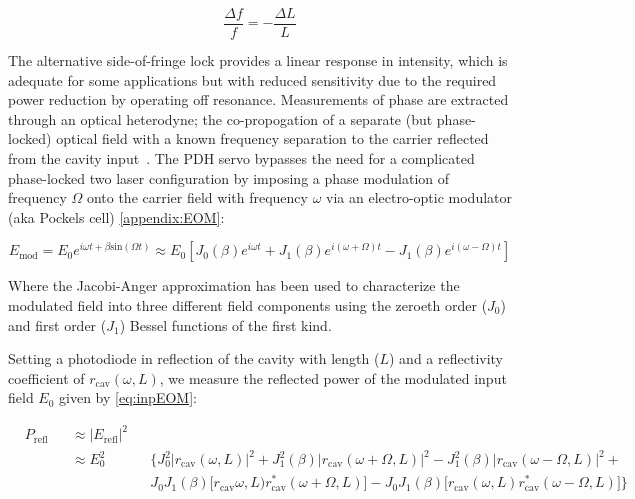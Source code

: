 \begin{equation}\label{eq:cavlf}
	\frac{\Delta f}{f} = -\frac{\Delta L}{L}
\end{equation}

\noindent The alternative side-of-fringe lock provides a linear response in intensity, which is adequate for some applications but with reduced sensitivity due to the required power reduction by operating off resonance. Measurements of phase are extracted through an optical heterodyne; the co-propogation of a separate (but phase-locked) optical field with a known frequency separation to the carrier reflected from the cavity input~\cite{black:pdh}. The PDH servo bypasses the need for a complicated phase-locked two laser configuration by imposing a phase modulation of frequency $\Omega$ onto the carrier field with frequency $\omega$ via an electro-optic modulator (aka Pockels cell) \autoref{appendix:EOM}:

\begin{equation}\label{eq:inpEOM}
	E_\mathrm{mod} = E_0 e^{i \omega t + \beta \mathrm{sin}( \Omega t)} \approx E_0 [J_0(\beta)e^{i \omega t} + J_1(\beta) e^{i(\omega + \Omega)t} - J_1(\beta) e^{i(\omega - \Omega)t}]  
\end{equation}

Where the Jacobi-Anger approximation has been used to characterize the modulated field into three different field components using the zeroeth order ($J_0$) and first order ($J_1$) Bessel functions of the first kind. 

Setting a photodiode in reflection of the cavity with length ($L$) and a reflectivity coefficient of $r_\mathrm{cav}(\omega,L)$, we measure the reflected power of the modulated input field $E_0$ given by \autoref{eq:inpEOM}\;:

\begin{equation}
 \begin{alignedat}{3}
    &P_\mathrm{refl} && \approx |E_\mathrm{refl}|^2 && \\
    & &&\approx E_0^2  && \bigg\{J_0^2 |r_\mathrm{cav}(\omega,L)|^2 + J_1^2(\beta)|r_\mathrm{cav}(\omega+\Omega,L)|^2 - J_1^2(\beta)|r_\mathrm{cav}(\omega-\Omega,L)|^2 +  \\
    & && && J_0J_1(\beta)\big[r_\mathrm{cav}\omega,L) r_\mathrm{cav}^*(\omega+\Omega,L)\big] - J_ 0J_1(\beta)\big[r_\mathrm{cav}(\omega,L)r_\mathrm{cav}^*(\omega-\Omega,L)\big]\bigg\}
  \end{alignedat}
\end{equation}

